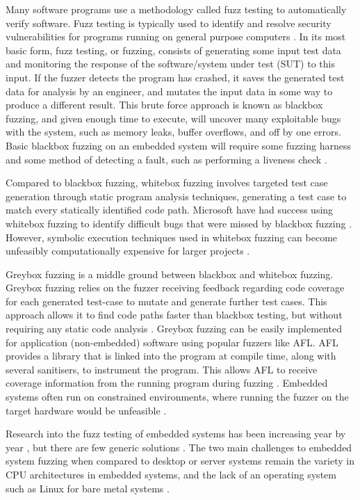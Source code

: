 \documentclass[../report.tex]{subfiles}
\begin{document}
Many software programs use a methodology called fuzz testing to automatically
verify software. Fuzz testing is typically used to identify and resolve
security vulnerabilities for programs running on general purpose computers
\citep{Google_2023}. In its most basic form, fuzz testing, or fuzzing, consists
of generating some input test data and monitoring the response of the
software/system under test (SUT) to this input. If the fuzzer detects the
program has crashed, it saves the generated test data for analysis by an
engineer, and mutates the input data in some way to produce a different result.
This brute force approach is known as blackbox fuzzing, and given enough time
to execute, will uncover many exploitable bugs with the system, such as memory
leaks, buffer overflows, and off by one errors. Basic blackbox fuzzing on an
embedded system will require some fuzzing harness \citep{Eisele_et_al_2022} and
some method of detecting a fault, such as performing a liveness check
\citep{Yun_2022}.

Compared to blackbox fuzzing, whitebox fuzzing involves targeted test case
generation through static program analysis techniques, generating a test case
to match every statically identified code path. Microsoft have had success
using whitebox fuzzing to identify difficult bugs that were missed by
blackbox fuzzing \citep{Godefroid_2012}. However, symbolic execution
techniques used in whitebox fuzzing can become unfeasibly computationally
expensive for larger projects \citep{Krishnamoorthy_2010}.

Greybox fuzzing is a middle ground between blackbox and whitebox fuzzing.
Greybox fuzzing relies on the fuzzer receiving feedback regarding code coverage
for each generated test-case to mutate and generate further test cases. This
approach allows it to find code paths faster than blackbox testing, but without
requiring any static code analysis \citep{Yun_2022}. Greybox fuzzing can be
easily implemented for application (non-embedded) software using popular
fuzzers like AFL. AFL provides a library that is linked into the program at
compile time, along with several sanitisers, to instrument the program. This
allows AFL to receive coverage information from the running program during
fuzzing \citep{AFL_2019}. Embedded systems often run on constrained
environments, where running the fuzzer on the target hardware would be
unfeasible \citep{Yun_2022}.

Research into the fuzz testing of embedded systems has been increasing
year by year \citep{Yun_2022}, but there are few generic solutions
\citep{Eisele_et_al_2022}. The two main challenges to embedded system fuzzing
when compared to desktop or server systems remain the variety in CPU
architectures in embedded systems, and the lack of an operating system such as
Linux for bare metal systems \citep{Eisele_et_al_2022}.
\end{document}
